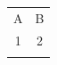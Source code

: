\documentclass{standalone}
\begin{document}
\begin{tabular}{|c|c|}\hhline{|==|}A&B\\\hhline{|--|}1&2\\\hhline{|==|}\end{tabular}
\end{document}
